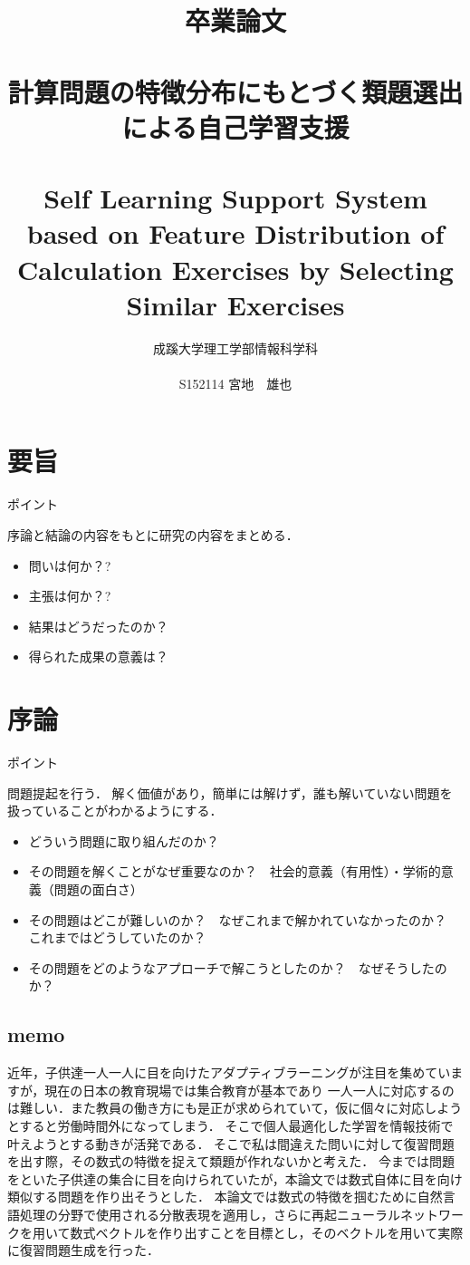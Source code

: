 \documentclass[a4j,11pt,report]{jsbook}
\title{卒業論文\\　\vspace{3em}\\{\huge #1}\\　\\#2\vspace{15em}}%
\author{{\huge 成蹊大学理工学部情報科学科}\\　\\{\huge #3}}%
\date{}
\newcommand{\frontpage}[3]{%
\title{卒業論文\\　\vspace{3em}\\{\huge #1}\\　\\#2\vspace{15em}}%
\author{{\huge 成蹊大学理工学部情報科学科}\\　\\{\huge #3}}%
\date{}
\maketitle
\clearpage
\thispagestyle{empty}

\clearpage
}
\newcommand{\point}[1]{
\begin{itembox}[l]{ポイント}
  #1
\end{itembox}
}
\begin{document}
\frontpage  %
{計算問題の特徴分布にもとづく類題選出による自己学習支援}
{Self Learning Support System based on Feature Distribution of Calculation Exercises by Selecting Similar Exercises}
{S152114 宮地　雄也}

\chapter*{要旨}
\thispagestyle{empty}
\point{
序論と結論の内容をもとに研究の内容をまとめる．
\begin{itemize}
  \item 問いは何か？?
  \item 主張は何か？?
  \item 結果はどうだったのか？
  \item 得られた成果の意義は？
\end{itemize}
}

\tableofcontents
\thispagestyle{empty}
\clearpage
\thispagestyle{plain}
\setcounter{page}{1}

\chapter{序論 \label{ch:introduction}}

\point{
問題提起を行う．
解く価値があり，簡単には解けず，誰も解いていない問題を扱っていることがわかるようにする．
\begin{itemize}
  \item どういう問題に取り組んだのか？
  \item その問題を解くことがなぜ重要なのか？　社会的意義（有用性）・学術的意義（問題の面白さ）
  \item その問題はどこが難しいのか？　なぜこれまで解かれていなかったのか？　これまではどうしていたのか？
  \item その問題をどのようなアプローチで解こうとしたのか？　なぜそうしたのか？
\end{itemize}
}

\section{memo}
近年，子供達一人一人に目を向けたアダプティブラーニングが注目を集めていますが，現在の日本の教育現場では集合教育が基本であり
一人一人に対応するのは難しい．また教員の働き方にも是正が求められていて，仮に個々に対応しようとすると労働時間外になってしまう．
そこで個人最適化した学習を情報技術で叶えようとする動きが活発である．
そこで私は間違えた問いに対して復習問題を出す際，その数式の特徴を捉えて類題が作れないかと考えた．
今までは問題をといた子供達の集合に目を向けられていたが，本論文では数式自体に目を向け類似する問題を作り出そうとした．
本論文では数式の特徴を掴むために自然言語処理の分野で使用される分散表現を適用し，さらに再起ニューラルネットワークを用いて数式ベクトルを作り出すことを目標とし，そのベクトルを用いて実際に復習問題生成を行った．
\end{document}

